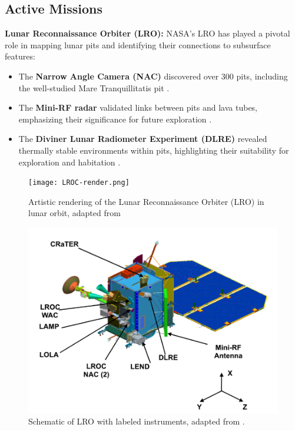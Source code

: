 \subsection{Active Missions}

\textbf{Lunar Reconnaissance Orbiter (LRO):}  
NASA’s LRO has played a pivotal role in mapping lunar pits and identifying their connections to subsurface features:
\begin{itemize}
    \item The \textbf{Narrow Angle Camera (NAC)} discovered over 300 pits, including the well-studied Mare Tranquillitatis pit \cite{thermal-lunar-pits}.
    \item The \textbf{Mini-RF radar} validated links between pits and lava tubes, emphasizing their significance for future exploration \cite{new-wagner}.
    \item The \textbf{Diviner Lunar Radiometer Experiment (DLRE)} revealed thermally stable environments within pits, highlighting their suitability for exploration and habitation \cite{thermal-lunar-pits}.
\end{itemize}

\begin{figure}[h!]
    \centering
    \begin{minipage}{0.48\textwidth}
        \centering
        \texttt{[image: LROC-render.png]}
        \caption{Artistic rendering of the Lunar Reconnaissance Orbiter (LRO) in lunar orbit, adapted from \cite{lro}}
        \label{fig:lro_render}
    \end{minipage}
    \hfill
    \begin{minipage}{0.48\textwidth}
        \centering
        \includegraphics[width=\textwidth]{LROC-schema.png}
        \caption{Schematic of LRO with labeled instruments, adapted from \cite{lro}.}
        \label{fig:lro_schema}
    \end{minipage}
\end{figure}

